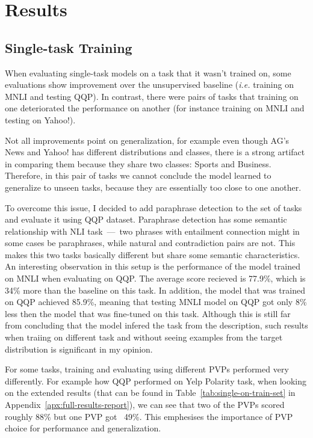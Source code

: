 \documentclass[11pt,a4paper]{article}
\begin{document}
\section{Results}
\subsection*{Single-task Training}
When evaluating single-task models on a task that it wasn't trained on, some evaluations show improvement over the unsupervised baseline (\textit{i.e.} training on MNLI and testing QQP).
In contrast, there were pairs of tasks that training on one deteriorated the performance on another (for instance training on MNLI and testing on Yahoo!).

Not all improvements point on generalization, for example even though AG's News and Yahoo! has different distributions and classes, there is a strong artifact in comparing them because they share two classes: Sports and Business.
Therefore, in this pair of tasks we cannot conclude the model learned to generalize to unseen tasks, because they are essentially too close to one another.

To overcome this issue, I decided to add paraphrase detection to the set of tasks and evaluate it using QQP dataset.
Paraphrase detection has some semantic relationship with NLI task~---~two phrases with entailment connection might in some cases be paraphrases, while natural and contradiction pairs are not.
This makes this two tasks basically different but share some semantic characteristics. 
An interesting observation in this setup is the performance of the model trained on MNLI when evaluating on QQP.
The average score recieved is 77.9\%, which is 34\% more than the baseline on this task.
In addition, the model that was trained on QQP achieved 85.9\%, meaning that testing MNLI model on QQP got only 8\% less then the model that was fine-tuned on this task.
Although this is still far from concluding that the model infered the task from the description, such results when traiing on different task and without seeing examples from the target distribution is significant in my opinion.

For some tasks, training and evaluating using different PVPs performed very differently.
For example how QQP performed on Yelp Polarity task, when looking on the extended results (that can be found in Table~\ref{tab:single-on-train-set} in Appendix~\ref{apx:full-results-report}), we can see that two of the PVPs scored roughly 88\% but one PVP got ~49\%.
This emphesises the importance of PVP choice for performance and generalization.
\end{document}
